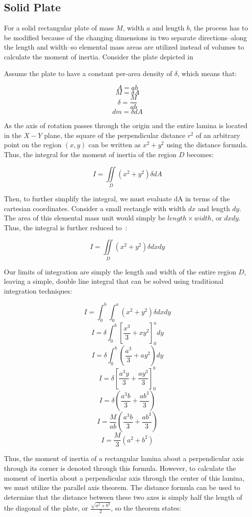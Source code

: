 \subsection{Solid Plate}

For a solid rectangular plate of mass $M$, width $a$ and length $b$, the process has to be modified because of the changing dimensions in two separate directions--along the length and width--so elemental mass areas are utilized instead of volumes to calculate the moment of inertia. Consider the plate depicted in 



Assume the plate to have a constant per-area density of $\delta$, which means that:

\[A = ab\]
\[M = \delta A\]
\[\delta = \frac{M}{ab}\]
\[dm = \delta dA\]


As the axis of rotation passes through the origin and the entire lamina is located in the $X-Y$ plane, the square of the perpendicular distance $r^2$ of an arbitrary point on the region $(x, y)$ can be written as $x^2+y^2$ using the distance formula. Thus, the integral for the moment of inertia of the region $D$ becomes:

\[I = \iint\limits_{D} (x^2+y^2)\delta dA\]

Then, to further simplify the integral, we must evaluate dA in terms of the cartesian coordinates. Consider a small rectangle with width $dx$ and length $dy$. The area of this elemental mass unit would simply be $length \times width$, or $dxdy$. Thus, the integral is further reduced to~\parencite{Hass_Heil_Weir_2018}:

\[I = \iint\limits_{D} (x^2+y^2)\delta dxdy\]

Our limits of integration are simply the length and width of the entire region $D$, leaving a simple, double line integral that can be solved using traditional integration techniques:

\[I = \int_0^b\int_0^a (x^2+y^2)\delta dxdy\]
\[I = \delta\int_0^b\left[\frac{x^3}{3}+xy^2\right]_0^a dy\]
\[I = \delta\int_0^b\left(\frac{a^3}{3}+ay^2\right) dy\]
\[I = \delta\left[\frac{a^3y}{3}+\frac{ay^3}{3}\right]_0^b\]
\[I = \delta\left(\frac{a^3b}{3}+\frac{ab^3}{3}\right)\]
\[I = \frac{M}{ab}\left(\frac{a^3b}{3}+\frac{ab^3}{3}\right)\]
\[I = \frac{M}{3}\left(a^2+b^2\right)\]

Thus, the moment of inertia of a rectangular lamina about a perpendicular axis through its corner is denoted through this formula. However, to calculate the moment of inertia about a perpendicular axis through the center of this lamina, we must utilize the parallel axis theorem. The distance formula can be used to determine that the distance between these two axes is simply half the length of the diagonal of the plate, or $\frac{\sqrt{a^2+b^2}}{2}$, so the theorem states:

